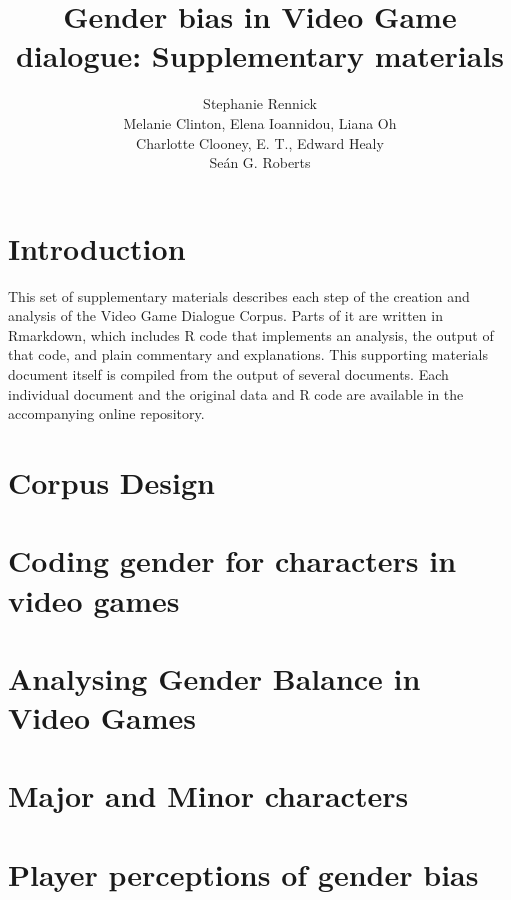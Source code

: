 \documentclass[12pt,a4paper]{article}
\author{Stephanie Rennick \\ Melanie Clinton, Elena Ioannidou, Liana Oh\\Charlotte Clooney, E. T., Edward Healy \\ Se\'{a}n G. Roberts}
\title{Gender bias in Video Game dialogue: Supplementary materials}
\newcommand{\includepdfPlus}[1]{}
\begin{document}
\maketitle
\tableofcontents

\clearpage
\newpage

\section{Introduction}

This set of supplementary materials describes each step of the creation and analysis of the Video Game Dialogue Corpus. Parts of it are written in Rmarkdown, which includes R code that implements an analysis, the output of that code, and plain commentary and explanations. This supporting materials document itself is compiled from the output of several documents. Each individual document and the original data and R code are available in the accompanying online repository.

\clearpage
\newpage
\section{Corpus Design}

\includepdfPlus{../../writeup/CorpusDescription.pdf}

\clearpage
\newpage

\section{Coding gender for characters in video games}

\includepdfPlus{../../writeup/CodingScheme.pdf}

\clearpage
\newpage

\section{Analysing Gender Balance in Video Games}

\includepdfPlus{../../analysis/Analyse_WordsPerGender.pdf}

\clearpage
\newpage
\section{Major and Minor characters}

\includepdfPlus{../../analysis/Analyse_MajorVsMinorCharacters.pdf}

\clearpage
\newpage
\section{Player perceptions of gender bias}
\end{document}
